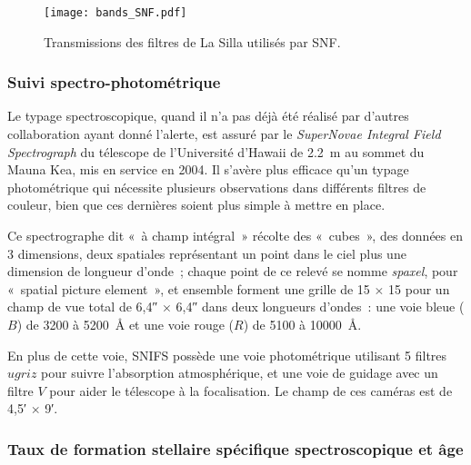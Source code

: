\documentclass[../main/main.tex]{subfiles}
\begin{document}
\begin{figure}[ht]
    \centering
    \texttt{[image: bands\_SNF.pdf]}
    \captionsetup{justification=centering}
    \caption{Transmissions des filtres de La Silla utilisés par SNF.}
    \label{fig:snfbands}
\end{figure}

\subsubsection{Suivi spectro-photométrique}\label{sssec:snfspectro}

Le typage spectroscopique, quand il n'a pas déjà été réalisé par d'autres
collaboration ayant donné l'alerte, est assuré par le \textit{SuperNovae
Integral Field Spectrograph} \citep[SNIFS,][]{lantz2004} du télescope de
l'Université d'Hawaii de \SI{2,2}{m} au sommet du Mauna Kea, mis en service en
2004. Il s'avère plus efficace qu'un typage photométrique qui nécessite
plusieurs observations dans différents filtres de couleur, bien que ces
dernières soient plus simple à mettre en place.

Ce spectrographe dit «~à champ intégral~» récolte des «~cubes~», des données en
3 dimensions, deux spatiales représentant un point dans le ciel plus une
dimension de longueur d'onde~; chaque point de ce relevé se nomme
\textit{spaxel}, pour «~spatial picture element~», et ensemble forment une
grille de 15 $\times$ 15 pour un champ de vue total de \ang{;;6,4} $\times$
\ang{;;6,4} dans deux longueurs d'ondes~: une voie bleue ($B$) de 3200 à
\SI{5200}{\angstrom} et une voie rouge ($R$) de 5100 à \SI{10000}{\angstrom}.

En plus de cette voie, SNIFS possède une voie photométrique utilisant 5 filtres
$ugriz$ pour suivre l'absorption atmosphérique, et une voie de guidage avec un
filtre $V$ pour aider le télescope à la focalisation. Le champ de ces caméras
est de \ang{;4,5;} $\times$ \ang{;9;}.

\subsubsection{Taux de formation stellaire spécifique
spectroscopique et âge}\label{sssec:snflssfr}
\end{document}
